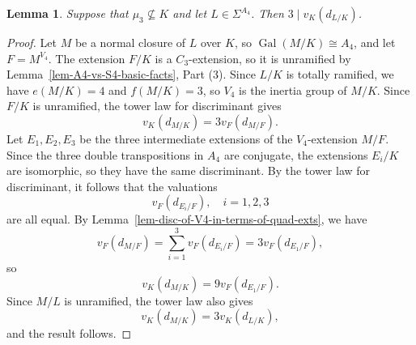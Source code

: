 \documentclass[11pt]{amsart}
\theoremstyle{theorem}
\newtheorem{lemma}[theorem]{Lemma}
\theoremstyle{example}
\theoremstyle{definition}
\numberwithin{theorem}{section}
\numberwithin{theorem}{section}
\DeclareMathOperator{\Gal}{Gal}
\begin{document}
\begin{lemma}
    \label{lem-A4-quartic-implies-disc-mult-3}
    Suppose that $\mu_3\not\subseteq K$ and let $L \in \Sigma^{A_4}$. Then $3 \mid v_K(d_{L/K})$. 
\end{lemma}
\begin{proof}
    Let $M$ be a normal closure of $L$ over $K$, so $\Gal(M/K) \cong A_4$, and let $F = M^{V_4}$. The extension $F/K$ is a $C_3$-extension, so it is unramified by Lemma~\ref{lem-A4-vs-S4-basic-facts}, Part (3). Since $L/K$ is totally ramified, we have $e(M/K) = 4$ and $f(M/K) = 3$, so $V_4$ is the inertia group of $M/K$. Since $F/K$ is unramified, the tower law for discriminant gives 
    $$
    v_K(d_{M/K}) = 3v_F(d_{M/F}). 
    $$
    Let $E_1,E_2, E_3$ be the three intermediate extensions of the $V_4$-extension $M/F$. Since the three double transpositions in $A_4$ are conjugate, the extensions $E_i/K$ are isomorphic, so they have the same discriminant. By the tower law for discriminant, it follows that the valuations
    $$
    v_{F}(d_{E_i/F}),\quad i = 1,2,3
    $$
    are all equal. By Lemma~\ref{lem-disc-of-V4-in-terms-of-quad-exts}, we have 
    $$
    v_F(d_{M/F}) = \sum_{i=1}^3 v_F(d_{E_i/F}) = 3v_F(d_{E_1/F}), 
    $$
    so 
    $$
    v_K(d_{M/K}) = 9v_F(d_{E_1/F}). 
    $$
    Since $M/L$ is unramified, the tower law also gives 
    $$
    v_K(d_{M/K}) = 3v_K(d_{L/K}),
    $$
    and the result follows.
\end{proof}
\end{document}
